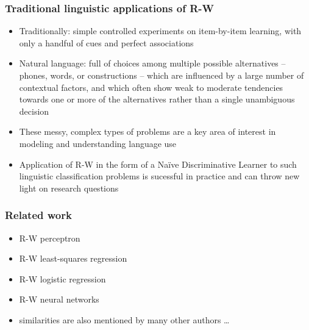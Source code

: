 \begin{frame}
  \frametitle{Traditional \vs linguistic applications of R-W}

  \begin{itemize}
  \item Traditionally: simple controlled experiments on item-by-item
    learning, with only a handful of cues and perfect associations
  \item Natural language: full of choices among multiple possible alternatives
    -- phones, words, or constructions -- which are influenced by a large
    number of contextual factors, and which often show weak to moderate 
    tendencies towards one or more of the alternatives rather than a
    single unambiguous decision
  \item These messy, complex types of problems are a key area of interest in
    modeling and understanding language use
  \item Application of R-W in the form of a Naïve Discriminative Learner to
    such linguistic classification problems is sucessful in practice and can 
    throw new light on research questions
  \end{itemize}
\end{frame}

\begin{frame}
  \frametitle{Related work}

  \begin{itemize}
  \item R-W \vs perceptron \citep[p.~155f]{Sutton:Barto:81}
  \item R-W \vs least-squares regression \citep[p.~457]{Stone:86}
  \item R-W \vs logistic regression \citep[p.~234]{Gluck:Bower:88}
  \item R-W \vs neural networks \citep{Dawson:08}
  \item[\hand] similarities are also mentioned by many other authors \ldots
  \end{itemize}
\end{frame}

